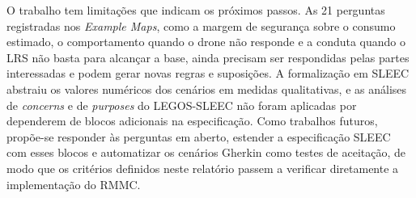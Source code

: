 \documentclass[a4paper, 12pt]{article}
\begin{document}
O trabalho tem limitações que indicam os próximos passos. As 21 perguntas registradas nos \textit{Example Maps}, como a margem de segurança sobre o consumo estimado, o comportamento quando o drone não responde e a conduta quando o LRS não basta para alcançar a base, ainda precisam ser respondidas pelas partes interessadas e podem gerar novas regras e suposições. A formalização em SLEEC abstraiu os valores numéricos dos cenários em medidas qualitativas, e as análises de \textit{concerns} e de \textit{purposes} do LEGOS-SLEEC não foram aplicadas por dependerem de blocos adicionais na especificação. Como trabalhos futuros, propõe-se responder às perguntas em aberto, estender a especificação SLEEC com esses blocos e automatizar os cenários Gherkin como testes de aceitação, de modo que os critérios definidos neste relatório passem a verificar diretamente a implementação do RMMC.



\end{document}
